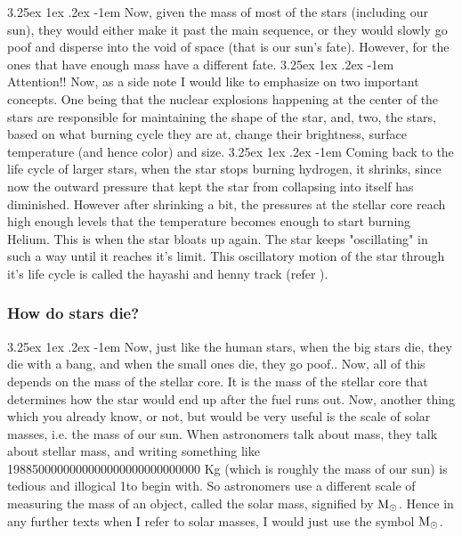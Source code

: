 \documentclass[a4paper,twoside,11pt]{article}
\makeatletter
\numberwithin{equation}{section}
\newcommand{\solmas}{\(\textup{M}_\odot\)}
\renewcommand\paragraph{\@startsection{paragraph}{5}{\z@}%
  {3.25ex \@plus1ex \@minus.2ex}%
  {-1em}%
  {\normalfont\normalsize\bfseries}}
\makeatother
\begin{document}
\paragraph{}
Now, given the mass of most of the stars (including our sun), they would either make it past the main sequence, or they would slowly go poof and disperse into the void of space (that is our sun's fate). However, for the ones that have enough mass have a different fate. 
\paragraph{Attention!!}
Now, as a side note I would like to emphasize on two important concepts. One being that the nuclear explosions happening at the center of the stars are responsible for maintaining the shape of the star, and, two, the stars, based on what burning cycle they are at, change their brightness, surface temperature (and hence color) and size. 
\paragraph{}
Coming back to the life cycle of larger stars, when the star stops burning hydrogen, it shrinks, since now the outward pressure that kept the star from collapsing into itself has diminished. However after shrinking a bit, the pressures at the stellar core reach high enough levels that the temperature becomes enough to start burning Helium. This is when the star bloats up again. The star keeps "oscillating" in such a way until it reaches it's limit. This oscillatory motion of the star through it's life cycle is called the hayashi and henny track (refer \cite{HayashiHenny}). 
\subsubsection{How do stars die?}
\paragraph{}
Now, just like the human stars, when the big stars die, they die with a bang, and when the small ones die, they go poof.. Now, all of this depends on the mass of the stellar core. It is the mass of the stellar core that determines how the star would end up after the fuel runs out. Now, another thing which you already know, or not, but would be very useful is the scale of solar masses, i.e. the mass of our sun. When astronomers talk about mass, they talk about stellar mass, and writing something like 1988500000000000000000000000000 Kg (which is roughly the mass of our sun) is tedious and illogical 1to begin with. So astronomers use a different scale of measuring the mass of an object, called the solar mass, signified by \solmas. Hence in any further texts when I refer to solar masses, I would just use the symbol \solmas. 
\end{document}
